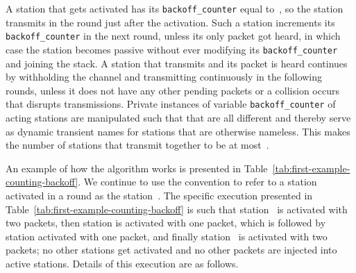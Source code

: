 \documentclass[11pt]{article}
\begin{document}
A station that gets activated has its \texttt{backoff\_counter} equal to~, so the station transmits in the round just after the activation.
Such a station increments its  \texttt{backoff\_counter} in the next round, unless its only packet got heard, in which case the station becomes passive without ever modifying its \texttt{backoff\_counter} and joining the stack.
A station that transmits and its packet is heard continues by withholding the channel and transmitting continuously in the following rounds, unless it does not have any other pending packets or a collision occurs that disrupts transmissions.
Private instances of variable \texttt{backoff\_counter} of acting stations are manipulated such that that are all different and thereby serve as dynamic transient names for stations that are otherwise  nameless.
This makes the number of stations that transmit together to be at most~.


An example of how the algorithm works is presented in Table~\ref{tab:first-example-counting-backoff}.
We continue to use the convention to refer to a station activated in a round  as the station~.
The specific execution presented in Table~\ref{tab:first-example-counting-backoff} is such that station~ is activated with two packets, then station  is activated with one packet, which is followed by station  activated with one packet, and finally station~ is activated with two packets; no other stations get activated and no other packets are injected into active stations.
Details of this execution are as follows.
\end{document}
